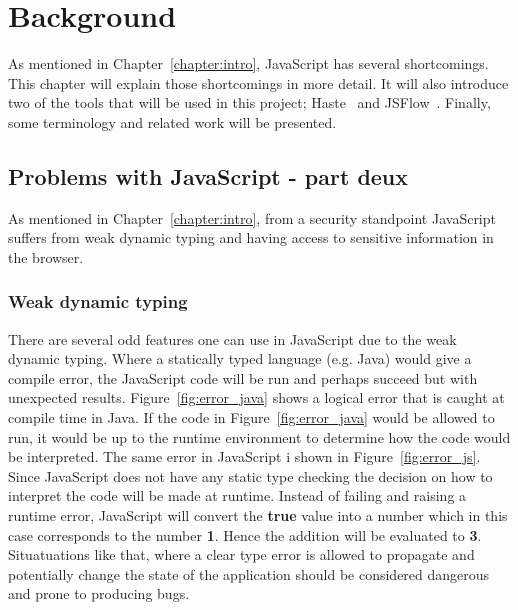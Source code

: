 \chapter{Background}
As mentioned in Chapter~\ref{chapter:intro}, JavaScript has several shortcomings. This chapter will explain those shortcomings in more detail. It will also introduce two of the tools that will be used in this project; Haste~\cite{haste-lang} and JSFlow~\cite{jsflow,jsflow-csf12,jsflow-sac14}. Finally, some terminology and related work will be presented.

\section{Problems with JavaScript - part deux}
As mentioned in Chapter~\ref{chapter:intro}, from a security standpoint JavaScript suffers from weak dynamic typing and having access to sensitive information in the browser.
\subsection{Weak dynamic typing}
\label{chapter:weak-dynamic-typing}
There are several odd features one can use in JavaScript due to the weak dynamic typing. Where a statically typed language (e.g. Java) would give a compile error, the JavaScript code will be run and perhaps succeed but with unexpected results. Figure~\ref{fig:error_java} shows a logical error that is caught at compile time in Java. If the code in Figure~\ref{fig:error_java} would be allowed to run, it would be up to the runtime environment to determine how the code would be interpreted. The same error in JavaScript i shown in Figure~\ref{fig:error_js}. Since JavaScript does not have any static type checking the decision on how to interpret the code will be made at runtime. Instead of failing and raising a runtime error, JavaScript will convert the \textbf{true} value into a number which in this case corresponds to the number \textbf{1}. Hence the addition will be evaluated to \textbf{3}. Situatuations like that, where a clear type error is allowed to propagate and potentially change the state of the application should be considered dangerous and prone to producing bugs.

